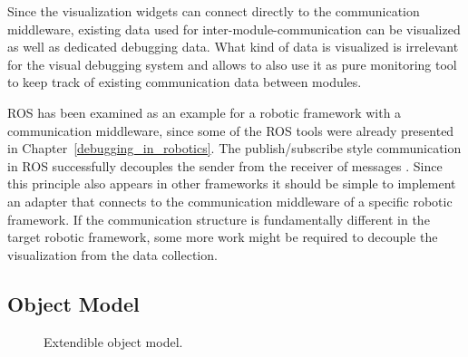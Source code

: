 Since the visualization widgets can connect directly to the communication middleware, existing data used for inter-module-communication can be visualized as well as dedicated debugging data. What kind of data is visualized is irrelevant for the visual debugging system and allows to also use it as pure monitoring tool to keep track of existing communication data between modules.

ROS has been examined as an example for a robotic framework with a communication middleware, since some of the ROS tools were already presented in Chapter~\ref{debugging_in_robotics}. The publish/subscribe style communication in ROS successfully decouples the sender from the receiver of messages \cite{Eugster2003}. Since this principle also appears in other frameworks it should be simple to implement an adapter that connects to the communication middleware of a specific robotic framework. If the communication structure is fundamentally different in the target robotic framework, some more work might be required to decouple the visualization from the data collection.

\subsection{Object Model}
\label{object_model_section}

\begin{figure}%
  \centering
  \caption{Extendible object model.}
  \label{class overview}
\end{figure}


